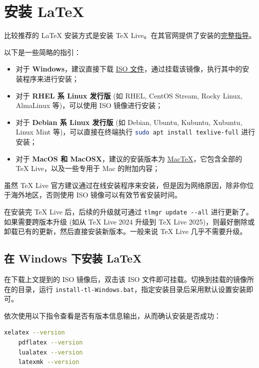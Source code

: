 \chapter{安装 \LaTeX{}}
\label{Installation_LaTeX}

比较推荐的 \LaTeX{} 安装方式是安装 TeX Live。在其官网提供了安装的\href{https://www.tug.org/texlive/quickinstall.html}{完整指导}。

以下是一些简略的指引：
\begin{itemize}
    \item 对于 \textbf{Windows}，建议直接下载 \href{https://www.tug.org/texlive/acquire-iso.html}{ISO 文件}，通过挂载该镜像，执行其中的安装程序来进行安装；
    \item 对于 \textbf{RHEL 系 Linux 发行版} (如 RHEL, CentOS Stream, Rocky Linux, AlmaLinux 等)，可以使用 ISO 镜像进行安装；
    \item 对于 \textbf{Debian 系 Linux 发行版} (如 Debian, Ubuntu, Kubuntu, Xubuntu, Linux Mint 等)，可以直接在终端执行 \lstinline[language=bash]!sudo apt install texlive-full! 进行安装；
    \item 对于 \textbf{MacOS 和 MacOSX}，建议的安装版本为 \href{https://www.tug.org/mactex/}{MacTeX}，它包含全部的 TeX Live，以及一些专用于 Mac 的附加内容；
\end{itemize}

虽然 TeX Live 官方建议通过在线安装程序来安装，但是因为网络原因，除非你位于海外地区，否则使用 ISO 镜像可以有效节省安装时间。

在安装完 TeX Live 后，后续的升级就可通过 \lstinline!tlmgr update --all! 进行更新了。如果需要跨版本升级 (如从 TeX Live 2024 升级到 TeX Live 2025)，则最好删除或卸载已有的更新，然后直接安装新版本。一般来说 TeX Live 几乎不需要升级。

\section{在 Windows 下安装 \LaTeX{}}
\label{Installation_LaTeX_Windows}

在下载上文提到的 ISO 镜像后，双击该 ISO 文件即可挂载。切换到挂载的镜像所在的目录，运行 \texttt{install-tl-Windows.bat}，指定安装目录后采用默认设置安装即可。

依次使用以下指令查看是否有版本信息输出，从而确认安装是否成功：
\begin{lstlisting}[language=bash]
    xelatex --version
    pdflatex --version
    lualatex --version
    latexmk --version
\end{lstlisting}

